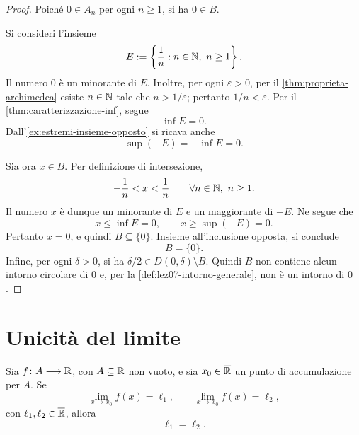 \begin{proof}
Poiché \(0\in A_n\) per ogni \(n\ge1\), si ha
\(0\in B\).

Si consideri l'insieme
\[
  E:=\left\{\frac1n:n\in\N,\ n\ge1\right\}.
\]
Il numero \(0\) è un minorante di \(E\). Inoltre, per
ogni \(\varepsilon>0\), per il \cref{thm:proprieta-archimedea}
esiste \(n\in\mathbb{N}\) tale che \(n>1/\varepsilon\);
pertanto \(1/n<\varepsilon\). Per il
\cref{thm:caratterizzazione-inf}, segue
\[
  \inf E=0.
\]
Dall'\cref{ex:estremi-insieme-opposto} si ricava anche
\[
  \sup(-E)=-\inf E=0.
\]

Sia ora \(x\in B\). Per definizione di intersezione,
\[
  -\frac1n<x<\frac1n
  \qquad\forall n\in\mathbb{N},\ n\ge1.
\]
Il numero \(x\) è dunque un minorante di \(E\) e un
maggiorante di \(-E\). Ne segue che
\[
  x\le\inf E=0,
  \qquad
  x\ge\sup(-E)=0.
\]
Pertanto \(x=0\), e quindi \(B\subseteq\{0\}\).
Insieme all'inclusione opposta, si conclude
\[
  B=\{0\}.
\]
Infine, per ogni \(\delta>0\), si ha
\(\delta/2\in D(0,\delta)\setminus B\).
Quindi \(B\) non contiene alcun intorno circolare di \(0\)
e, per la \cref{def:lez07-intorno-generale}, non è
un intorno di \(0\).
\end{proof}

\section{Unicità del limite}
\label{sec:lez11-unicita-limite}

\begin{theorem}
\label{thm:lez11-unicita-limite}
Sia \(f\colon A\longrightarrow\mathbb{R}\), con \(A\subseteq\mathbb{R}\)
non vuoto, e sia \(x_0\in\overline{\mathbb{R}}\) un punto di
accumulazione per \(A\). Se
\[
  \lim_{x\to x_0}f(x)=\ell_1,
  \qquad
  \lim_{x\to x_0}f(x)=\ell_2,
\]
con \(\ell_1,\ell_2\in\overline{\mathbb{R}}\), allora
\[
  \ell_1=\ell_2.
\]
\end{theorem}

